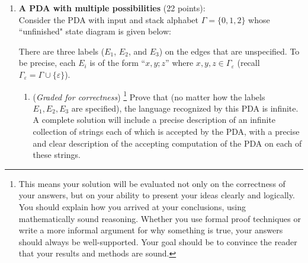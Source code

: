 \documentclass[12pt, oneside]{article}
\newcommand{\gradeCorrect}{({\it Graded for correctness}) }
\newcommand{\gradeCorrectFirst}{\gradeCorrect\footnote{This means your solution 
will be evaluated not only on the correctness of your answers, but on your ability
to present your ideas clearly and logically. You should explain how you 
arrived at your conclusions, using
mathematically sound reasoning. Whether you use formal proof techniques or 
write a more informal argument
for why something is true, your answers should always be well-supported. 
Your goal should be to convince the
reader that your results and methods are sound.} }
\begin{document}
\begin{enumerate} 

\item \textbf{A PDA with multiple possibilities} (22 points): \\
Consider the PDA with input and stack alphabet $\Gamma = \{0,1,2\}$ whose ``unfinished" 
state diagram is given below:

\begin{center}
\end{center}

There are three labels ($E_1$, $E_2$, and $E_3$) on the edges that are unspecified. 
To be precise, each $E_i$ is of the form ``$x,y; z$'' where $x, y, z \in \Gamma_{\varepsilon}$ 
(recall $\Gamma_{\varepsilon} = \Gamma \cup \{\varepsilon\}$).

\begin{enumerate}
    \item\gradeCorrectFirst Prove that (no matter how the labels $E_1, E_2, E_3$ are specified), 
    the language recognized by this 
    PDA is infinite. A complete solution will include a precise
    description of an infinite collection of strings each 
    of which is accepted by the PDA, with 
    a precise and
    clear description of the accepting computation of the PDA on 
    each of these strings.


\end{enumerate}
\end{enumerate}
\end{document}
